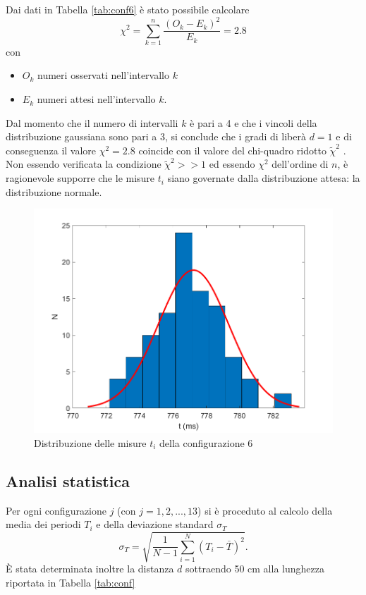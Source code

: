 \documentclass[11pt,a4paper]{article}
\begin{document}
Dai dati in Tabella \ref{tab:conf6} è stato possibile calcolare 
\begin{equation}
    \chi^2 = \sum_{k=1}^n \frac{(O_k - E_k)^2}{E_k} = 2.8
\end{equation}
con
\begin{itemize}
    \item $O_k$ numeri osservati nell'intervallo $k$
    \item $E_k$ numeri attesi nell'intervallo $k$.
\end{itemize}
Dal momento che il numero di intervalli $k$ è pari a 4 e che i vincoli della distribuzione gaussiana sono pari a 3, si conclude che i gradi di liberà $d=1$ e di conseguenza il valore $\chi^2 = 2.8$ coincide con il valore del chi-quadro ridotto $\tilde{\chi}^2$ . Non essendo verificata la condizione $\tilde{\chi}^2 >> 1$ ed essendo $\chi^2$ dell'ordine di $n$, è ragionevole supporre che le misure $t_i$ siano governate dalla distribuzione attesa: la distribuzione normale.
\begin{figure}[H]
    \centering
    \includegraphics[scale = .6]{img/chi.png}
    \caption{Distribuzione delle misure $t_i$ della configurazione 6}
    \label{fig:my_label}
\end{figure}

\subsection{Analisi statistica}
Per ogni configurazione $j$ (con $j = 1, 2, ..., 13$) si è proceduto al calcolo della media dei periodi $T_i$ e della deviazione standard $\sigma_T$
\begin{equation}
    \sigma_T = \sqrt{\frac{1}{N-1} \sum_{i=1}^N  (T_i - \bar{T})^2}.
\end{equation}
È stata determinata inoltre la distanza $d$ sottraendo 50 cm alla lunghezza riportata in Tabella \ref{tab:conf}
\end{document}
